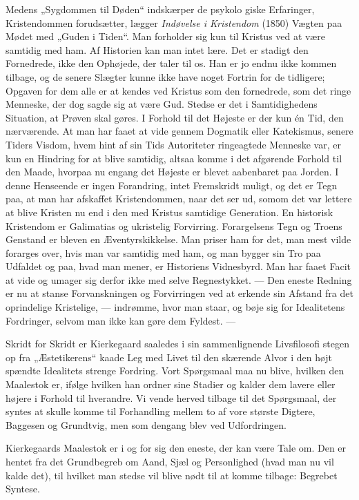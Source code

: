 \documentclass[12pt,a4paper,openany]{book}
\newcommand{\opage}[1]{\marginnote{\footnotesize\textit{[#1]}}}
\begin{document}
Medens „Sygdommen til Døden“ indskærper de psykolo%
\setcounter{footnote}{0}%
\opage{164}giske Erfaringer, Kristendommen forudsætter, lægger
\textit{Indøvelse i Kristendom} (1850) Vægten paa Mødet med „Guden i Tiden“.
Man forholder sig kun til Kristus ved at være samtidig med ham. Af Historien
kan man intet lære. Det er stadigt den Fornedrede, ikke den Ophøjede, der taler
til os. Han er jo endnu ikke kommen tilbage, og de senere Slægter kunne ikke
have noget Fortrin for de tidligere; Opgaven for dem alle er at kendes ved
Kristus som den fornedrede, som det ringe Menneske, der dog sagde sig at være
Gud. Stedse er det i Samtidighedens Situation, at Prøven skal gøres. I Forhold
til det Højeste er der kun én Tid, den nærværende. At man har faaet at vide
gennem Dogmatik eller Katekismus, senere Tiders Visdom, hvem hint af sin Tids
Autoriteter ringeagtede Menneske var, er kun en Hindring for at blive samtidig,
altsaa komme i det afgørende Forhold til den Maade, hvorpaa nu engang det
Højeste er blevet aabenbaret paa Jorden. I denne Henseende er ingen Forandring,
intet Fremskridt muligt, og det er Tegn paa, at man har afskaffet
Kristendommen, naar det ser ud, somom det var lettere at blive Kristen nu end i
den med Kristus samtidige Generation. En historisk Kristendom er Galimatias og
ukristelig Forvirring. Forargelsens Tegn og Troens Genstand er bleven en
Æventyrskikkelse. Man priser ham for det, man mest vilde forarges over, hvis
man var samtidig med ham, og man bygger sin Tro paa Udfaldet og paa, hvad man
mener, er Historiens Vidnesbyrd. Man har faaet Facit at vide og umager sig
derfor ikke med selve Regnestykket. --- Den eneste Redning er nu at stanse
Forvanskningen og Forvirringen ved at erkende sin Afstand fra det oprindelige
Kristelige, --- indrømme, hvor man staar, og bøje sig for Idealitetens
Fordringer, selvom man ikke kan gøre dem Fyldest. ---

Skridt for Skridt er Kierkegaard saaledes i sin sammenlignende Livsfilosofi
stegen op fra „Æstetikerens“ kaade Leg med Livet til den skærende Alvor i den
højt spændte Idealitets strenge Fordring. Vort Spørgsmaal maa nu blive, hvilken
den Maalestok er, ifølge hvilken han ordner sine Stadier og kalder dem lavere
eller højere i Forhold til hverandre. Vi
\setcounter{footnote}{0}%
\opage{165}vende herved tilbage til det Spørgsmaal, der syntes at skulle komme
til Forhandling mellem to af vore største Digtere, Baggesen og Grundtvig, men
som dengang blev ved Udfordringen.

Kierkegaards Maalestok er i og for sig den eneste, der kan være Tale om. Den er
hentet fra det Grundbegreb om Aand, Sjæl og Personlighed (hvad man nu vil kalde
det), til hvilket man stedse vil blive nødt til at komme tilbage: Begrebet Syntese.
\end{document}
